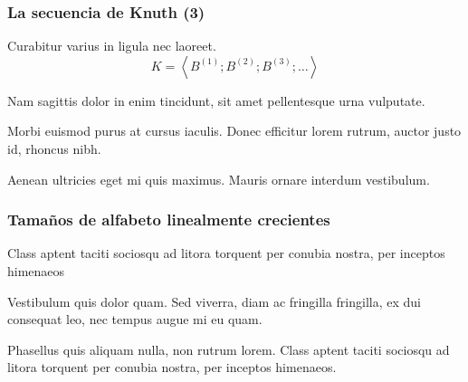 \documentclass[t, 10pt, mathserif]{beamer}
\begin{document}

\begin{frame}
  \frametitle{La secuencia de Knuth (3)}

  Curabitur varius in ligula nec laoreet.
  \begin{equation*}
    K = \left< B^{(1)} ; B^{(2)} ;  B^{(3)} ; \dots \right>
  \end{equation*}
  \pause

  \medskip
  \begin{theorem}
    Nam sagittis dolor in enim tincidunt, sit amet pellentesque urna vulputate.
  \end{theorem}
  \pause
  
  Morbi euismod purus at cursus iaculis. Donec efficitur lorem rutrum, auctor justo id, rhoncus nibh.
  \pause

  Aenean ultricies eget mi quis maximus. Mauris ornare interdum vestibulum.
\end{frame}



\begin{frame}
  \frametitle{Tamaños de alfabeto linealmente crecientes}

  \medskip
  \begin{theorem}
    Class aptent taciti sociosqu ad litora torquent per conubia nostra, per inceptos himenaeos
  \end{theorem}
  \pause

  \medskip
  \begin{corollary}
    Vestibulum quis dolor quam. Sed viverra, diam ac fringilla fringilla, ex dui consequat leo, nec tempus augue mi eu quam.
  \end{corollary}
  \pause

  \medskip
  \begin{theorem}
    Phasellus quis aliquam nulla, non rutrum lorem. Class aptent taciti sociosqu ad litora torquent per conubia nostra, per inceptos himenaeos.
  \end{theorem}
\end{frame}
\end{document}
